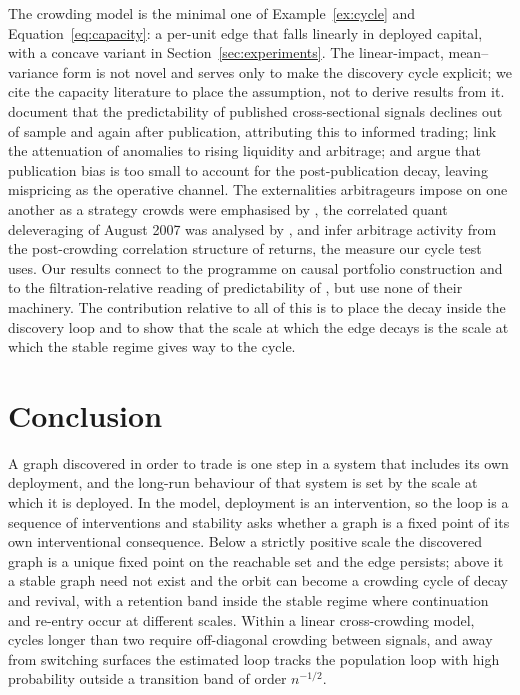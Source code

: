 \documentclass[11pt]{article}
\theoremstyle{plain}
\theoremstyle{definition}
\begin{document}
The crowding model is the minimal one of Example~\ref{ex:cycle} and Equation~\eqref{eq:capacity}: a per-unit edge that falls linearly in deployed capital, with a concave variant in Section~\ref{sec:experiments}. The linear-impact, mean--variance form is not novel and serves only to make the discovery cycle explicit; we cite the capacity literature to place the assumption, not to derive results from it. \citet{mclean2016} document that the predictability of published cross-sectional signals declines out of sample and again after publication, attributing this to informed trading; \citet{chordia2014} link the attenuation of anomalies to rising liquidity and arbitrage; and \citet{chen2020} argue that publication bias is too small to account for the post-publication decay, leaving mispricing as the operative channel. The externalities arbitrageurs impose on one another as a strategy crowds were emphasised by \citet{stein2009}, the correlated quant deleveraging of August 2007 was analysed by \citet{khandani2011}, and \citet{lou2022} infer arbitrage activity from the post-crowding correlation structure of returns, the measure our cycle test uses. Our results connect to the programme on causal portfolio construction \citep{rodriguez2023, rodriguez2025causal, rodriguez2025necessary, rodriguez2025pde} and to the filtration-relative reading of predictability of \citep{noguer2026markets}, but use none of their machinery. The contribution relative to all of this is to place the decay inside the discovery loop and to show that the scale at which the edge decays is the scale at which the stable regime gives way to the cycle.

\FloatBarrier
\section{Conclusion}\label{sec:conclusion}

A graph discovered in order to trade is one step in a system that includes its own deployment, and the long-run behaviour of that system is set by the scale at which it is deployed. In the model, deployment is an intervention, so the loop is a sequence of interventions and stability asks whether a graph is a fixed point of its own interventional consequence. Below a strictly positive scale the discovered graph is a unique fixed point on the reachable set and the edge persists; above it a stable graph need not exist and the orbit can become a crowding cycle of decay and revival, with a retention band inside the stable regime where continuation and re-entry occur at different scales. Within a linear cross-crowding model, cycles longer than two require off-diagonal crowding between signals, and away from switching surfaces the estimated loop tracks the population loop with high probability outside a transition band of order $n^{-1/2}$.
\end{document}
